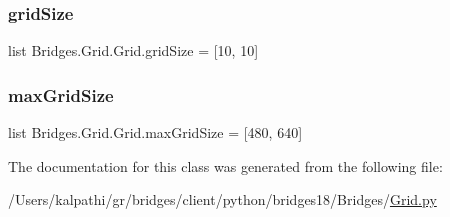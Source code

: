 \subsubsection{\texorpdfstring{grid\+Size}{gridSize}}
{\footnotesize\ttfamily list Bridges.\+Grid.\+Grid.\+grid\+Size = \mbox{[}10, 10\mbox{]}\hspace{0.3cm}{\ttfamily [static]}}

\mbox{\label{class_bridges_1_1_grid_1_1_grid_aca620cf7545089b3bb603a7bd035afd6}} 
\subsubsection{\texorpdfstring{max\+Grid\+Size}{maxGridSize}}
{\footnotesize\ttfamily list Bridges.\+Grid.\+Grid.\+max\+Grid\+Size = \mbox{[}480, 640\mbox{]}\hspace{0.3cm}{\ttfamily [static]}}



The documentation for this class was generated from the following file\+:\begin{DoxyCompactItemize}
\item 
/\+Users/kalpathi/gr/bridges/client/python/bridges18/\+Bridges/\mbox{\hyperlink{_grid_8py}{Grid.\+py}}\end{DoxyCompactItemize}
